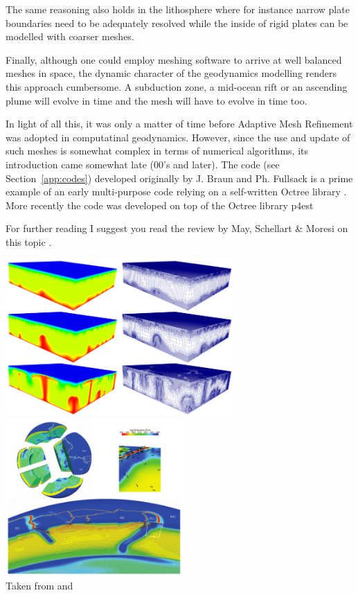 The same reasoning also holds in the lithosphere where for instance narrow plate boundaries need to 
be adequately resolved while the inside of rigid plates can be modelled with coarser meshes. 

Finally, although one could employ meshing software to arrive at well balanced meshes in space, the 
dynamic character of the geodynamics modelling renders this approach cumbersome. A subduction zone, 
a mid-ocean rift or an ascending plume will evolve in time and the mesh will have to evolve in time too. 

In light of all this, it was only a matter of time before Adaptive Mesh Refinement was adopted 
in computatinal geodynamics. However, since the use and update of such meshes is somewhat 
complex in terms of numerical algorithms, its introduction came somewhat late (00's and later).
The \douar code (see Section~\ref{app:codes}) developed originally by J. Braun and Ph. Fullsack 
is a prime example of an early multi-purpose code relying on a self-written Octree library \cite{brtf08}.
More recently the \aspect{} code was developed on top of the Octree library p4est \cite{buwg11}

For further reading I suggest you read the review by May, Schellart \& Moresi on this topic \cite{masm13}.

\begin{center}
\includegraphics[height=6cm]{images/meshes/bugg08.jpg}
\includegraphics[height=6cm]{images/meshes/bugg10.jpg}\\
{\captionfont Taken from \cite{bugg08} and \cite{bugg10}}
\end{center}

